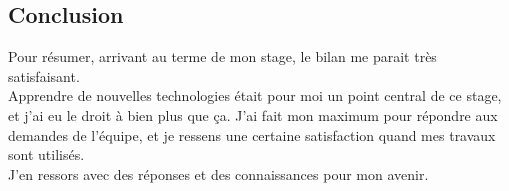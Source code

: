 \documentclass{rapport}
\begin{document}
\subsection*{Conclusion}
Pour résumer, arrivant au terme de mon stage, le bilan me parait très satisfaisant. \\
Apprendre de nouvelles technologies était pour moi un point central de ce stage, et j'ai eu le droit à bien plus que ça. J'ai fait mon maximum pour répondre aux demandes de l'équipe, et je ressens une certaine satisfaction quand mes travaux sont utilisés. \\
J'en ressors avec des réponses et des connaissances pour mon avenir.
\end{document}
